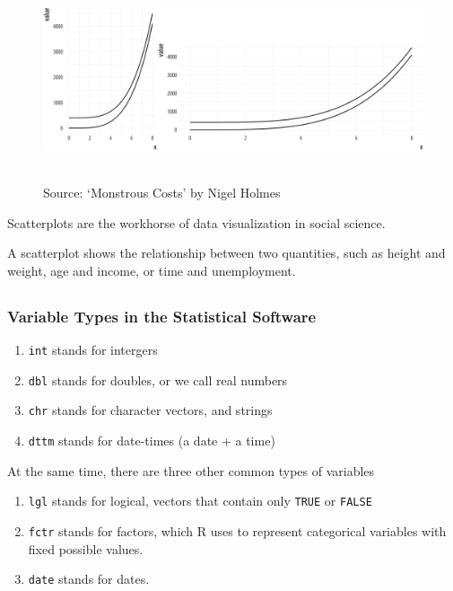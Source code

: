 \documentclass[11pt]{beamer}
\begin{document}
\begin{frame}
	
	\frametitle{\bfseries}
	\begin{figure}
		\vspace{-.5em}
		\includegraphics[width=0.9\linewidth]{Figure/perception-curves-1}
		
		\\
		\tiny{Source: `Monstrous Costs’ by Nigel Holmes}
		\label{fig:anscombe-1}
	\end{figure}
	\begin{itemize}
		\footnotesize{
			\item Scatterplots are the workhorse of data visualization in social science.
			\item A scatterplot shows the relationship between two quantities, such as height and weight, age and income, or time and unemployment. }
	\end{itemize}
\end{frame}

\begin{frame}
	\section{}
	\frametitle{\bfseries Variable Types in the Statistical Software}
	
	\begin{enumerate}
		\item \texttt{int} stands for intergers
		\item \texttt{dbl} stands for doubles, or we call real numbers
		\item \texttt{chr} stands for character vectors, and strings
		\item \texttt{dttm} stands for date-times (a date + a time)
	\end{enumerate}

At the same time, there are three other common types of variables
	\begin{enumerate}
		\item \texttt{lgl} stands for logical, vectors that contain only \texttt{TRUE} or \texttt{FALSE}
		\item \texttt{fctr} stands for factors, which R uses to represent categorical variables with fixed possible values.
		\item \texttt{date} stands for dates.
	\end{enumerate}
	
\end{frame}
\end{document}
